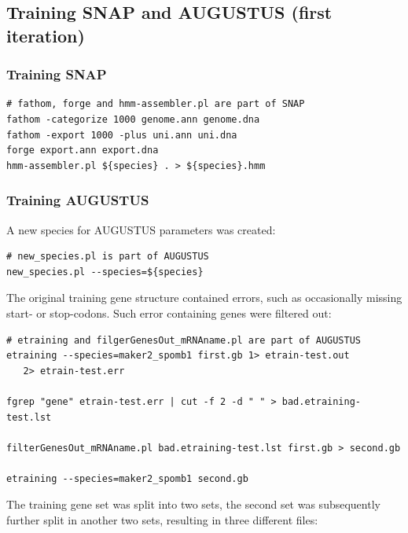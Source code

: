 \documentclass[a4paper,10pt]{report}
\begin{document}
\subsection{Training SNAP and AUGUSTUS (first iteration)}

\subsubsection{Training SNAP} \label{train_snap_it1}

\begin{verbatim}
# fathom, forge and hmm-assembler.pl are part of SNAP
fathom -categorize 1000 genome.ann genome.dna
fathom -export 1000 -plus uni.ann uni.dna
forge export.ann export.dna
hmm-assembler.pl ${species} . > ${species}.hmm
\end{verbatim}

\subsubsection{Training AUGUSTUS} \label{train_augustus_it1}

A new species for AUGUSTUS parameters was created:

\begin{verbatim}
# new_species.pl is part of AUGUSTUS
new_species.pl --species=${species}
\end{verbatim}


\noindent The original training gene structure contained errors, such as occasionally missing start- or stop-codons. Such error containing genes were filtered out:\\

\begin{verbatim}
# etraining and filgerGenesOut_mRNAname.pl are part of AUGUSTUS
etraining --species=maker2_spomb1 first.gb 1> etrain-test.out 
   2> etrain-test.err
   
fgrep "gene" etrain-test.err | cut -f 2 -d " " > bad.etraining-test.lst

filterGenesOut_mRNAname.pl bad.etraining-test.lst first.gb > second.gb

etraining --species=maker2_spomb1 second.gb
\end{verbatim}

\noindent The training gene set was split into two sets, the second set was subsequently further split in another two sets, resulting in three different files:
\end{document}
